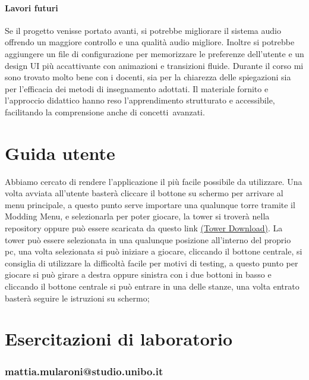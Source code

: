 \documentclass[a4paper,12pt]{report}
\begin{document}
\subsubsection{Lavori futuri}
Se il progetto venisse portato avanti, si potrebbe migliorare il sistema audio offrendo un maggiore controllo e una qualità audio migliore. Inoltre si potrebbe aggiungere un file di configurazione per memorizzare le preferenze dell’utente e un design UI più accattivante con animazioni e transizioni fluide.
Durante il corso mi sono trovato molto bene con i docenti, sia per la chiarezza delle spiegazioni sia per l’efficacia dei metodi di insegnamento adottati. Il materiale fornito e l’approccio didattico hanno reso l’apprendimento strutturato e accessibile, facilitando la comprensione anche di concetti avanzati.
\appendix
\chapter{Guida utente}

Abbiamo cercato di rendere l'applicazione il più facile possibile da utilizzare.
%
Una volta avviata all'utente basterà cliccare il bottone su schermo per arrivare al menu principale,
%
a questo punto serve importare una qualunque torre tramite il Modding Menu, e selezionarla per poter giocare, la tower si troverà nella repository
%
oppure può essere scaricata da questo link \href{https://google.com}{(Tower Download)}. La tower può essere selezionata in una qualunque posizione
%
all'interno del proprio pc, una volta selezionata si può iniziare a giocare, cliccando il bottone centrale, si consiglia di utilizzare la difficoltà facile per motivi di testing,
%
a questo punto per giocare si può girare a destra oppure sinistra con i due bottoni in basso e cliccando il bottone centrale
%
si può entrare in una delle stanze, una volta entrato basterà seguire le istruzioni su schermo;

\chapter{Esercitazioni di laboratorio}

\subsection{mattia.mularoni@studio.unibo.it}
\end{document}
